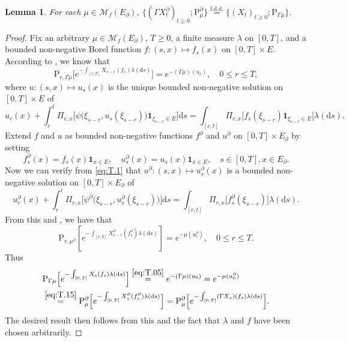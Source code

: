 \documentclass[12pt,a4paper]{amsart}
\numberwithin{equation}{section}
\theoremstyle{plain}
\newtheorem{lem}[thm]{Lemma}
\theoremstyle{definition}
\theoremstyle{remark}
\begin{document}
\begin{lem} \label{thm:T.1}
	For each $\mu \in \mathcal M_f(E_\partial)$,
$
	\{(\Gamma X^\partial_t)_{t\geq 0}; \mathrm P_\mu^\partial\} \overset{\text{f.d.d.}}= \{(X_t)_{t\geq 0}; \mathrm P_{\Gamma\mu}\}.
$
\end{lem}
\begin{proof}	
	Fix an arbitrary $\mu\in \mathcal M_f(E_\partial)$, $T\geq 0$, a finite measure $\lambda$ on $[0,T]$, and a bounded non-negative Borel function $f:(s,x)\mapsto f_s(x)$ on $[0,T]\times E$.
	According to \cite[Theorem 5.15]{Li2011Measure-valued}, we know that
\begin{equation} \label{eq:T.05}
\mathrm P_{r,\Gamma\mu}\Big[e^{-\int_{[r,T]} X_{s-r}(f_s)\lambda(\mathrm ds)  } \Big] = e^{-(\Gamma\mu)(u_r)}, \quad 0\leq r\leq T,
\end{equation}
	where $u:(s,x)\mapsto u_s(x)$ is the unique bounded non-negative solution on $[0,T]\times E$ of
\begin{equation} \label{eq:T.1}
	u_r(x) + \int_r^t \Pi_{r, x}\big[\psi\big(\xi_{s-r}, u_s(\xi_{s-r})\big)\mathbf 1_{\xi_{s-r}\in E}\big] \mathrm ds
	= \int_{[r,t]} \Pi_{r, x} \big[f_s(\xi_{s-r}) \mathbf 1_{\xi_{s-r} \in E}\big] \lambda(\mathrm ds).
\end{equation}
	Extend $f$ and $u$ as bounded non-negative functions $f^\partial$ and $u^\partial$ on $[0,T]\times E_\partial$ by setting
\[
	f^\partial_s(x) = f_s(x) \mathbf 1_{x\in E}, \quad u^\partial_s(x) = u_s(x) \mathbf 1_{x\in E},\quad s\in [0,T], x\in E_\partial.
\]
	Now we can verify from \eqref{eq:T.1} that $u^\partial:(s,x)\mapsto u^\partial_s(x)$ is a bounded non-negative solution on $[0,T]\times E_\partial$ of
\begin{equation}
	u_r^\partial(x) + \int_r^t \Pi_{r, x}\big[\psi^\partial\big(\xi_{s-r}, u^\partial_s(\xi_{s-r})\big)\big] \mathrm ds
	= \int_{[r,t]} \Pi_{r, x} \big[f_s^\partial(\xi_{s-r})\big] \lambda(\mathrm ds).
\end{equation}
	From this and \cite[Theorem 5.15]{Li2011Measure-valued}, we have that
\begin{equation} \label{eq:T.15}
	\mathrm P_{r, \mu^\partial} 
	[e^{-\int_{[r,T]} X^\partial_{s-r}(f^\partial_s) \lambda(\mathrm ds)}]
	= e^{-\mu(u^\partial_r)},
	\quad 0\leq r\leq T.
\end{equation}
Thus
\begin{align}
	&\mathrm P_{\Gamma\mu}\Big[e^{-\int_{[0,T]} X_s(f_s)\lambda(\mathrm ds)  } \Big]
	\overset{\eqref{eq:T.05}}= e^{-(\Gamma \mu)(u_0)}
	= e^{-\mu(u_0^\partial)}
	\\&\overset{\eqref{eq:T.15}}= \mathrm P_\mu^\partial \Big[ e^{-\int_{[0,T]} X_s^\partial(f_s^\partial)\lambda(\mathrm ds)} \Big]
	= \mathrm P_\mu^\partial \Big[ e^{-\int_{[0,T]} (\Gamma X_s)(f_s)\lambda(\mathrm ds)} \Big].
\end{align}
	The desired result then follows from this and the fact that $\lambda$ and $f$ have been chosen arbitrarily.
\end{proof}
\end{document}
